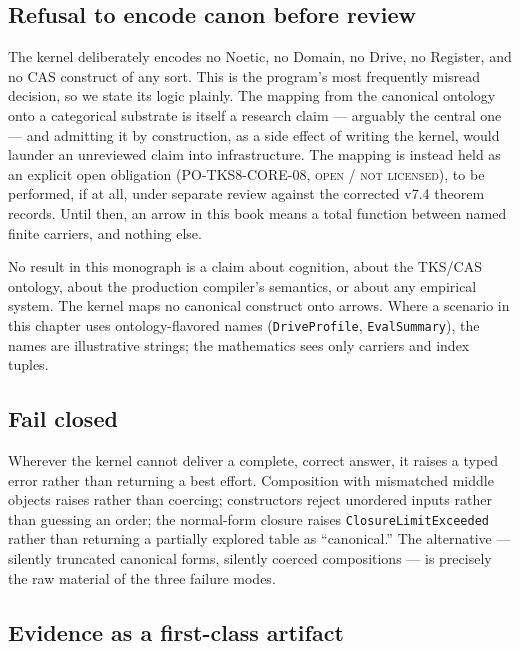 \subsection{Refusal to encode canon before review}

The kernel deliberately encodes no Noetic, no Domain, no Drive, no Register,
and no CAS construct of any sort. This is the program's most frequently
misread decision, so we state its logic plainly. The mapping from the
canonical ontology onto a categorical substrate is itself a research claim
--- arguably the central one --- and admitting it by construction, as a side
effect of writing the kernel, would launder an unreviewed claim into
infrastructure. The mapping is instead held as an explicit open obligation
(PO-TKS8-CORE-08, \textsc{open / not licensed}), to be performed, if at all,
under separate review against the corrected v7.4 theorem records. Until
then, an arrow in this book means a total function between named finite
carriers, and nothing else.

\begin{boundary}\label{ch01:boundary:no-canon}
No result in this monograph is a claim about cognition, about the TKS/CAS
ontology, about the production compiler's semantics, or about any empirical
system. The kernel maps no canonical construct onto arrows. Where a scenario
in this chapter uses ontology-flavored names (\texttt{DriveProfile},
\texttt{EvalSummary}), the names are illustrative strings; the mathematics
sees only carriers and index tuples.
\end{boundary}

\subsection{Fail closed}

Wherever the kernel cannot deliver a complete, correct answer, it raises a
typed error rather than returning a best effort. Composition with mismatched
middle objects raises rather than coercing; constructors reject unordered
inputs rather than guessing an order; the normal-form closure raises
\texttt{ClosureLimitExceeded} rather than returning a partially explored
table as ``canonical.'' The alternative --- silently truncated canonical
forms, silently coerced compositions --- is precisely the raw material of the
three failure modes.

\subsection{Evidence as a first-class artifact}

